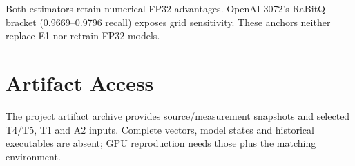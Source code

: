 Both estimators retain numerical FP32 advantages. OpenAI-3072's RaBitQ bracket (0.9669--0.9796 recall) exposes grid sensitivity. These anchors neither replace E1 nor retrain FP32 models.

\section{Artifact Access}
\label{sec:b-artifacts}
The \href{https://github.com/lrlorry/8800_report/blob/main/docs/artifact-access.md}{project artifact archive} provides source/measurement snapshots and selected T4/T5, T1 and A2 inputs. Complete vectors, model states and historical executables are absent; GPU reproduction needs those plus the matching environment.